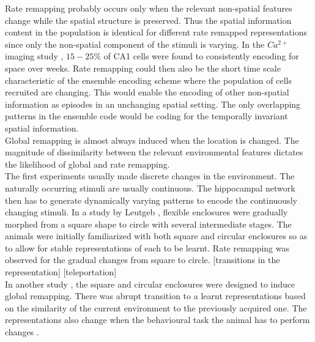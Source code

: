 Rate remapping probably occurs only when the relevant non-spatial features change while the spatial structure is preserved. Thus the spatial information content in the population is identical for different rate remapped representations since only the non-spatial component of the stimuli is varying. In the $Ca^{2+}$ imaging study \cite{Ziv2013}, $15-25 \% $ of CA1 cells were found to consistently encoding for space over weeks. Rate remapping could then also be the short time scale characteristic of the ensemble encoding scheme where the population of cells recruited are changing. This would enable the encoding of other non-spatial information as episodes in an unchanging spatial setting. The only overlapping patterns in the ensemble code would be coding for the temporally invariant spatial information. \\
Global remapping is almost always induced when the location is changed. The magnitude of dissimilarity between the relevant environmental features dictates the likelihood of global and rate remapping. \\
The first experiments usually made discrete changes in the environment. The naturally occurring stimuli are usually continuous. The hippocampal network then has to generate dynamically varying patterns to encode the continuously changing stimuli. In a study by Leutgeb \cite{Leutgeb2005}, flexible enclosures were gradually morphed from a square shape to circle with several intermediate stages. The animals were initially familiarized with both square and circular enclosures so as to allow for stable representations of each to be learnt. Rate remapping was observed for the gradual changes from square to circle.  [transitions in the representation] [teleportation]\\
In another study \cite{Wills2005}, the square and circular enclosures were designed to induce global remapping. There was abrupt transition to a learnt representations based on the similarity of the current environment to the previously acquired one. The representations also change when the behavioural task the animal has to perform changes \cite{Markus1995}. \\
